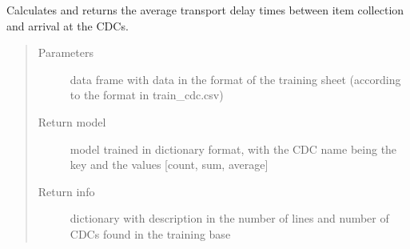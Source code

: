 \documentclass[letterpaper,10pt,english]{sphinxmanual}
\begin{document}
\begin{fulllineitems}
\label{\detokenize{algorithms:algorithms.cdc.cdc_trainer.train}}
\sphinxAtStartPar
Calculates and returns the average transport delay times between item collection and arrival at the CDCs.
\begin{quote}\begin{description}
\item[{Parameters}] \leavevmode
\sphinxAtStartPar
{} \textendash{} data frame with data in the format of the training sheet (according to the format in train\_cdc.csv)

\item[{Return model}] \leavevmode
\sphinxAtStartPar
model trained in dictionary format, with the CDC name being the key and the values {[}count, sum, average{]}

\item[{Return info}] \leavevmode
\sphinxAtStartPar
dictionary with description in the number of lines and number of CDCs found in the training base

\end{description}\end{quote}

\end{fulllineitems}


\sphinxAtStartPar
{}

\label{\detokenize{algorithms:module-algorithms.cdc.cdc_predictor}}
\end{document}
